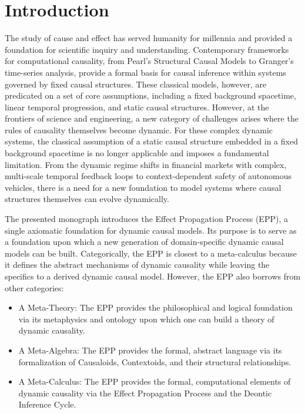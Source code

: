 \section{Introduction}
\label{sec:introduction}

The study of cause and effect has served humanity for millennia and provided a foundation for scientific inquiry and understanding. Contemporary frameworks for computational causality, from Pearl's Structural Causal Models to Granger's time-series analysis, provide a formal basis for causal inference within systems governed by fixed causal structures. These classical models, however, are predicated on a set of core assumptions, including a fixed background spacetime, linear temporal progression, and static causal structures. However, at the frontiers of science and engineering, a new category of challenges arises where the rules of causality themselves become dynamic. For these complex dynamic systems, the classical assumption of a static causal structure embedded in a fixed background spacetime is no longer applicable and imposes a fundamental limitation. From the dynamic regime shifts in financial markets with complex, multi-scale temporal feedback loops to context-dependent safety of autonomous vehicles, there is a need for a new foundation to model systems where causal structures themselves can evolve dynamically.

The presented monograph introduces the Effect Propagation Process (EPP), a single axiomatic foundation for dynamic causal models. Its purpose is to serve as a foundation upon which a new generation of domain-specific dynamic causal models can be built. Categorically, the EPP is closest to a meta-calculus because it defines the abstract mechanisms of dynamic causality while leaving the specifics to a derived dynamic causal model. However, the EPP also borrows from other categories:

\begin{itemize}
\item A Meta-Theory: The EPP provides the philosophical and logical foundation via its metaphysics and ontology upon which one can build a theory of dynamic causality.
\item A Meta-Algebra: The EPP provides the formal, abstract language via its formalization of Causaloids, Contextoids, and their structural relationships.
\item A Meta-Calculus: The EPP provides the formal, computational elements of dynamic causality via the Effect Propagation Process and the Deontic Inference Cycle.
\end{itemize}
  
